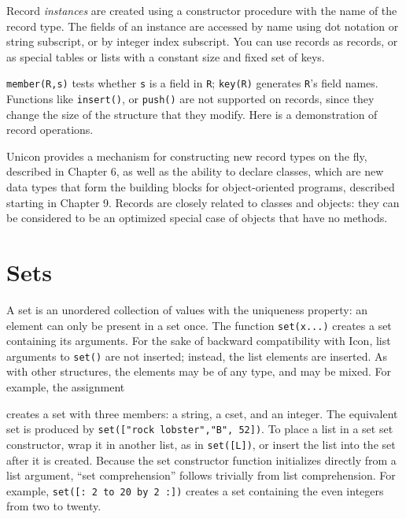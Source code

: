 
Record \textit{instances} are created using a
constructor procedure with the name of the record type. The
fields of an instance are accessed by name using dot notation or string
subscript, or by integer index subscript. You can use records as
records, or as special tables or lists with
a constant size and fixed set of keys.

\texttt{member(R,s)} tests whether \texttt{s} is a field in \texttt{R};
\texttt{key(R)} generates \texttt{R}'s field names.
Functions like \texttt{insert()}, or \texttt{push()} are not supported
on records, since they change the size of the structure that they
modify. Here is a demonstration of record operations.


Unicon provides a mechanism for constructing new record types on the
fly, described in Chapter 6, as well as the ability to declare classes,
which are new data types that form the building blocks for
object-oriented programs, described starting in Chapter 9. Records are
closely related to classes and objects: they can be considered to be an
optimized special case of objects that have no methods. \ 

\section{Sets}

A set is an unordered collection of values with the
uniqueness property: an element can only be present in a set once. The
function \texttt{set(x...)} creates a set containing its arguments. For
the sake of backward compatibility with Icon, list arguments to
\texttt{set()} are not inserted; instead, the list elements are
inserted. As with other structures, the elements may be of any type,
and may be mixed. For example, the assignment


\noindent
creates a set with three members: a string, a cset, and an integer. The
equivalent set is produced by
\texttt{set(["rock lobster","B", 52])}. To place a list in a set
set constructor, wrap it in another list, as in \texttt{set([L])},
or insert the list into the set after it is created. Because the set
constructor function initializes directly from a list argument,
``set comprehension'' follows trivially from list comprehension. For
example, \texttt{set([: 2 to 20 by 2 :])} creates a set containing the
even integers from two to twenty.

